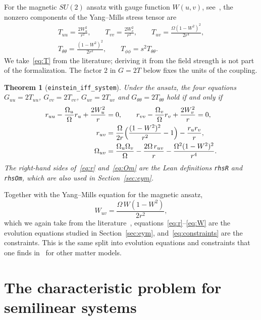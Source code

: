\documentclass[pdflatex,sn-mathphys-num]{sn-jnl}%
\theoremstyle{thmstyleone}%
\newtheorem{theorem}{Theorem}%
\theoremstyle{thmstyletwo}%
\theoremstyle{thmstylethree}%
\newcommand{\lean}[1]{\texttt{#1}}
\begin{document}
For the magnetic $SU(2)$ ansatz with gauge function $W(u,v)$, see~\cite{BartnikMcKinnon1988,VolkovGaltsov1999}, the nonzero components of the Yang--Mills stress tensor are
\begin{equation}\label{eq:T}
\begin{gathered}
T_{uu}=\frac{2W_u^2}{r^2},\qquad T_{vv}=\frac{2W_v^2}{r^2},\qquad T_{uv}=\frac{\Omega(1-W^2)^2}{2r^4},\\
T_{\theta\theta}=\frac{(1-W^2)^2}{2r^2},\qquad T_{\phi\phi}=s^2T_{\theta\theta}.
\end{gathered}
\end{equation}
We take~\eqref{eq:T} from the literature; deriving it from the field strength is not part of the formalization. The factor $2$ in $G=2T$ below fixes the units of the coupling.

\begin{theorem}[\lean{einstein\_iff\_system}]\label{thm:reduction}
Under the ansatz, the four equations $G_{uu}=2T_{uu}$, $G_{vv}=2T_{vv}$, $G_{uv}=2T_{uv}$ and $G_{\theta\theta}=2T_{\theta\theta}$ hold if and only if
\begin{align}
r_{uu}-\frac{\Omega_u}{\Omega}r_u+\frac{2W_u^2}{r}&=0,\qquad r_{vv}-\frac{\Omega_v}{\Omega}r_v+\frac{2W_v^2}{r}=0,\label{eq:constraints}\\
r_{uv}&=\frac{\Omega}{2r}\Bigl(\frac{(1-W^2)^2}{r^2}-1\Bigr)-\frac{r_ur_v}{r},\label{eq:r}\\
\Omega_{uv}&=\frac{\Omega_u\Omega_v}{\Omega}-\frac{2\Omega\,r_{uv}}{r}-\frac{\Omega^2(1-W^2)^2}{r^4}.\label{eq:Om}
\end{align}
The right-hand sides of~\eqref{eq:r} and~\eqref{eq:Om} are the Lean definitions \lean{rhsR} and \lean{rhsOm}, which are also used in Section~\ref{sec:eym}.
\end{theorem}

Together with the Yang--Mills equation for the magnetic ansatz,
\begin{equation}\label{eq:W}
W_{uv}=\frac{\Omega\,W(1-W^2)}{2r^2},
\end{equation}
which we again take from the literature~\cite{VolkovGaltsov1999}, equations~\eqref{eq:r}--\eqref{eq:W} are the evolution equations studied in Section~\ref{sec:eym}, and~\eqref{eq:constraints} are the constraints. This is the same split into evolution equations and constraints that one finds in~\cite{Christodoulou1986,Dafermos2005} for other matter models.

\section{The characteristic problem for semilinear systems}\label{sec:goursat}
\end{document}
